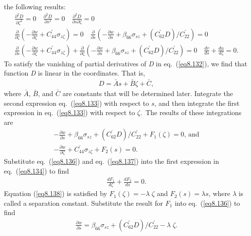 \documentclass{AeroStructure-ERJohnson}
\begin{document}
the following results:
\begin{gather}
\frac{\partial^{2} D}{\partial \zeta^{2}}=0 \quad
\frac{\partial^{2} D}{\partial s^{2}}=0 \quad \frac{\partial^{2}
D}{\partial s \partial \zeta}=0\label{eq8.132}\\
\frac{\partial}{\partial \zeta}\left(-\frac{\partial w}{\partial
\zeta}+C_{44}^{\prime} \sigma_{z \zeta}\right)=0 \quad
\frac{\partial}{\partial s}\left(-\frac{\partial w}{\partial
s}+\beta_{66} \sigma_{s z}+\left(C_{62}^{\prime} D\right)/
C_{22}^{\prime}\right)=0\label{eq8.133}\\
\frac{\partial}{\partial s}\left(-\frac{\partial w}{\partial
\zeta}+C^{\prime}_{44} \sigma_{z
\zeta}\right)+\frac{\partial}{\partial \zeta}\left(-\frac{\partial
w}{\partial s}+\beta_{66} \sigma_{s z}+\left(C^{\prime}_{62}
D\right)/ C_{22}^{\prime}\right)=0 \quad \frac{d v}{d s}+\frac{d
u}{d \zeta}=0.\label{eq8.134}
\end{gather}
To satisfy the vanishing of partial derivatives of \textit{D} in
eq.~(\ref{eq8.132}), we find that function \textit{D} is linear in
the coordinates. That is,
\begin{align}\label{eq8.135}
D=\bar{A} s+\bar{B} \zeta+\bar{C},
\end{align}
where $\bar{A}$, $\bar{B}$, and $\bar{C}$ are
constants that will be determined later. Integrate the second
expression eq.~(\ref{eq8.133}) with respect to $s$, and then
integrate the first expression in eq.~(\ref{eq8.133}) with respect
to $\zeta$. The results of these integrations are
\begin{gather}
-\frac{\partial w}{\partial s}+\beta_{66} \sigma_{s
z}+\left(C_{62}^{\prime} D\right)/
C_{22}^{\prime}+F_{1}(\zeta)=0\mbox{, and}\label{eq8.136}\\
-\frac{\partial
w}{\partial \zeta}+C_{44}^{\prime} \sigma_{z \zeta}+F_{2}(s)=0.\label{eq8.137}
\end{gather}
Substitute eq.~(\ref{eq8.136}) and eq.~(\ref{eq8.137}) into the
first expression in eq.~(\ref{eq8.134}) to find
\begin{align}\label{eq8.138}
\frac{d F_{1}}{d \zeta}+\frac{d F_{2}}{d s}=0.
\end{align}
Equation (\ref{eq8.138}) is satisfied by $F_{1}(\zeta)=-\lambda\;
\zeta$ and $F_{2}(s)=\lambda s$, where $\lambda$ is called a separation
constant. Substitute the result for ${F}_1$ into
eq.~(\ref{eq8.136}) to find
\begin{align}\label{eq8.139}
\frac{\partial w}{\partial s}=\beta_{66} \sigma_{s
z}+\left(C_{62}^{\prime} D\right)/ C_{22}^{\prime}-\lambda\;\zeta.
\end{align}
\end{document}
